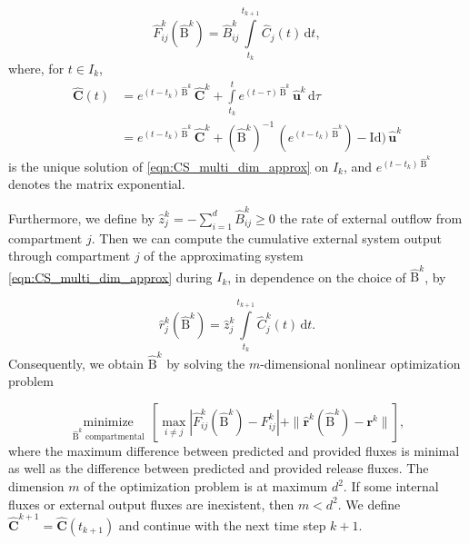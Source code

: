 \documentclass[draft]{agujournal2019}
\renewcommand{\vec}[1]{\mathbf{#1}}
\newcommand{\tens}[1]{\mathrm{#1}}
\newcommand{\id}{\tens{Id}}
\newcommand{\dd}[1]{\,\mathrm{d}#1}
\newcommand{\intl}{\int\limits}
\begin{document}
        \begin{equation*}
            \widehat{F}^k_{ij}(\widehat{\tens{B}}^k) = \widehat{B}^k_{ij}\intl_{t_k}^{t_{k+1}} \widehat{C}_j(t)\dd{t},
        \end{equation*}
        where, for $t\in I_k$,
        \begin{align*}
            \widehat{\vec{C}}(t) &= e^{(t-t_k)\,\widehat{\tens{B}}^k}\,\widehat{\vec{C}}^k + \intl_{t_k}^t e^{(t-\tau)\,\widehat{\tens{B}}^k}\,\widehat{\vec{u}}^k\dd{\tau}\\
            &= e^{(t-t_k)\,\widehat{\tens{B}}^k}\,\widehat{\vec{C}}^k + (\widehat{\tens{B}}^k)^{-1}\,(e^{(t-t_k)\,\widehat{\tens{B}}^k})-\id)\,\widehat{\vec{u}}^k
        \end{align*}
        is the unique solution of \eqref{eqn:CS_multi_dim_approx} on $I_k$, and $e^{(t-t_k)\,\widehat{\tens{B}}^k}$ denotes the matrix exponential.

        Furthermore, we define by $\widehat{z}^k_j=-\sum_{i=1}^d \widehat{B}^k_{ij} \geq 0$ the rate of external outflow from compartment $j$.
        Then we can compute the cumulative external system output through compartment $j$ of the approximating system \eqref{eqn:CS_multi_dim_approx} during $I_k$, in dependence on the choice of $\widehat{\tens{B}}^k$, by

        \begin{equation*}
            \widehat{r}^k_j(\widehat{\tens{B}}^k) = \widehat{z}^k_j\intl_{t_k}^{t_{k+1}} \widehat{C}^k_j(t)\dd{t}.
        \end{equation*}
        Consequently, we obtain $\widehat{\tens{B}}^k$ by solving the $m$-dimensional nonlinear optimization problem

        \begin{equation*}
            \underset{\widehat{\tens{B}}^k\text{ compartmental}}{\operatorname{minimize}}\,\left[\max\limits_{i\neq j} |\widehat{F}^k_{ij}(\widehat{\tens{B}}^k)-F^k_{ij}| + \|\widehat{\vec{r}}^k(\widehat{\tens{B}}^k)-\vec{r}^k \| \right],
        \end{equation*}
        where the maximum difference between predicted and provided fluxes is minimal as well as the difference between predicted and provided release fluxes. 
        The dimension $m$ of the optimization problem is at maximum $d^2$.
        If some internal fluxes or external output fluxes are inexistent, then $m<d^2$.
        We define $\widehat{\vec{C}}^{k+1}=\widehat{\vec{C}}(t_{k+1})$ and continue with the next time step $k+1$.\\
\end{document}
